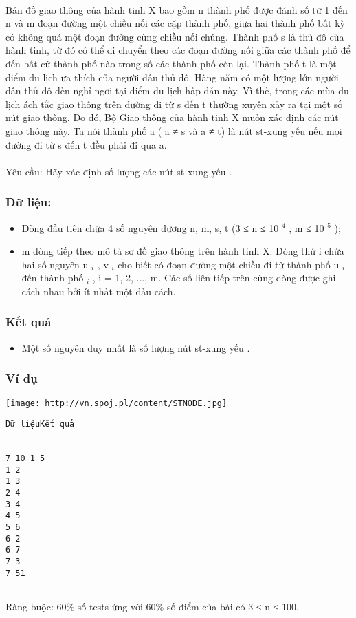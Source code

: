 

 

Bản đồ giao thông của hành tinh X bao gồm n thành phố được đánh số từ 1 đến n và m đoạn đường một chiều nối các cặp thành phố, giữa hai thành phố bất kỳ có không quá một đoạn đường cùng chiều nối chúng. Thành phố s là thủ đô của hành tinh, từ đó có thể di chuyển theo các đoạn đường nối giữa các thành phố để đến bất cứ thành phố nào trong số các thành phố còn lại. Thành phố t là một điểm du lịch ưa thích của người dân thủ đô. Hàng năm có một lượng lớn người dân thủ đô đến nghỉ ngơi tại điểm du lịch hấp dẫn này. Vì thế, trong các mùa du lịch ách tắc giao thông trên đường đi từ s đến t thường xuyên xảy ra tại một số nút giao thông. Do đó, Bộ Giao thông của hành tinh X muốn xác định các nút giao thông này. Ta nói thành phố a ( a ≠ s và a ≠ t) là nút st-xung yếu nếu mọi đường đi từ s đến t đều phải đi qua a.
\\
\\Yêu cầu: Hãy xác định số lượng các nút st-xung yếu .

\subsubsection{Dữ liệu:}
\begin{itemize}
	\item Dòng đầu tiên chứa 4 số nguyên dương n, m, s, t (3 ≤ n ≤ 10 $^ 4 $ , m ≤ 10 $^ 5 $ );
	\item m dòng tiếp theo mô tả sơ đồ giao thông trên hành tinh X: Dòng thứ i chứa hai số nguyên u $_ i $ , v $_ i $ cho biết có đoạn đường một chiều đi từ thành phố u $_ i $ đến thành phố $_ i $ , i = 1, 2, ..., m. Các số liên tiếp trên cùng dòng được ghi cách nhau bởi ít nhất một dấu cách.
\end{itemize}

\subsubsection{Kết quả}
\begin{itemize}
	\item Một số nguyên duy nhất là số lượng nút st-xung yếu .
\end{itemize}

\subsubsection{Ví dụ}


\texttt{[image: http://vn.spoj.pl/content/STNODE.jpg]}
\begin{verbatim}
Dữ liệuKết quả


7 10 1 5
1 2
1 3
2 4
3 4
4 5
5 6
6 2
6 7
7 3
7 51


\end{verbatim}

Ràng buộc: 60\% số tests ứng với 60\% số điểm của bài có 3 ≤ n ≤ 100.